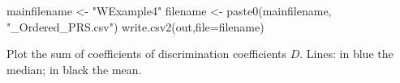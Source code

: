 \documentclass[
]{article}
\newenvironment{Shaded}{\begin{snugshade}}{\end{snugshade}}
\newcommand{\AttributeTok}[1]{\textcolor[rgb]{0.77,0.63,0.00}{#1}}
\newcommand{\ConstantTok}[1]{\textcolor[rgb]{0.00,0.00,0.00}{#1}}
\newcommand{\DecValTok}[1]{\textcolor[rgb]{0.00,0.00,0.81}{#1}}
\newcommand{\FunctionTok}[1]{\textcolor[rgb]{0.00,0.00,0.00}{#1}}
\newcommand{\NormalTok}[1]{#1}
\newcommand{\OtherTok}[1]{\textcolor[rgb]{0.56,0.35,0.01}{#1}}
\newcommand{\SpecialCharTok}[1]{\textcolor[rgb]{0.00,0.00,0.00}{#1}}
\newcommand{\StringTok}[1]{\textcolor[rgb]{0.31,0.60,0.02}{#1}}
\begin{document}
\begin{Shaded}
\begin{Highlighting}[]
\NormalTok{mainfilename }\OtherTok{\textless{}{-}} \StringTok{"WExample4"}
\NormalTok{filename }\OtherTok{\textless{}{-}} \FunctionTok{paste0}\NormalTok{(mainfilename, }\StringTok{"\_Ordered\_PRS.csv"}\NormalTok{)}
\FunctionTok{write.csv2}\NormalTok{(out,}\AttributeTok{file=}\NormalTok{filename)}
\end{Highlighting}
\end{Shaded}

Plot the sum of coefficients of discrimination coefficients \(D\).
Lines: in blue the median; in black the mean.

\begin{Shaded}
\end{Shaded}
\end{document}
